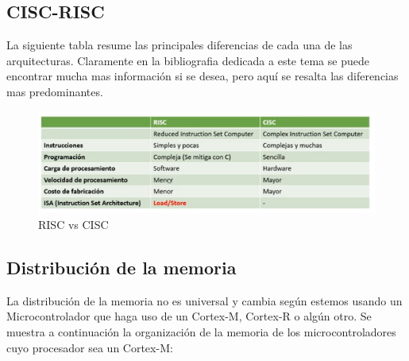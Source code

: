 \documentclass[a4paper,12pt]{report} %
\begin{document}
\subsection{CISC-RISC}

La siguiente tabla resume las principales diferencias de cada una de las arquitecturas. Claramente en la bibliografia dedicada a este tema se puede encontrar mucha mas información si se desea, pero aquí se resalta las diferencias mas predominantes.

\begin{figure}[H]
	\centering
	\includegraphics[scale=0.45]{Imagenes/stm/risc-cisc}
	\caption{RISC vs CISC}
	\label{cr}
\end{figure}


\subsection{Distribución de la memoria}

La distribución de la memoria no es universal y cambia según estemos usando un Microcontrolador que haga uso de un Cortex-M, Cortex-R o algún otro. Se muestra a continuación la organización de la memoria de los microcontroladores cuyo procesador sea un Cortex-M:
\end{document}
